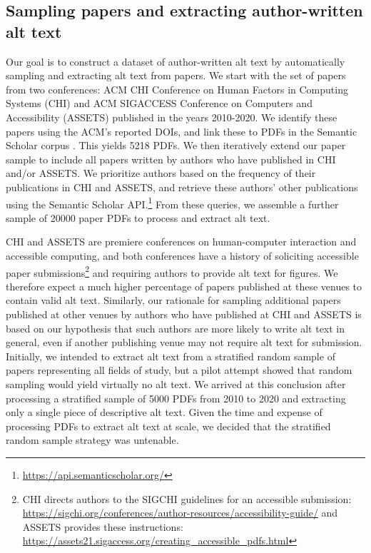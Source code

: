 \documentclass[sigconf]{acmart}
\begin{document}
\subsection{Sampling papers and extracting author-written alt text}

Our goal is to construct a dataset of author-written alt text by automatically sampling and extracting alt text from papers. We start with the set of papers from two conferences: ACM CHI Conference on Human Factors in Computing Systems (CHI) and ACM SIGACCESS Conference on Computers and Accessibility (ASSETS) published in the years 2010-2020. We identify these papers using the ACM's reported DOIs, and link these to PDFs in the Semantic Scholar corpus \citep{Ammar2018ConstructionOT}. This yields 5218 PDFs. We then iteratively extend our paper sample to include all papers written by authors who have published in CHI and/or ASSETS. We prioritize authors based on the frequency of their publications in CHI and ASSETS, and retrieve these authors' other publications using the Semantic Scholar API.\footnote{\href{https://api.semanticscholar.org/}{https://api.semanticscholar.org/}} From these queries, we assemble a further sample of 20000 paper PDFs to process and extract alt text.

CHI and ASSETS are premiere conferences on human-computer interaction and accessible computing, and both conferences have a history of soliciting accessible paper submissions\footnote{CHI directs authors to the SIGCHI guidelines for an accessible submission: \href{https://sigchi.org/conferences/author-resources/accessibility-guide/}{https://sigchi.org/conferences/author-resources/accessibility-guide/} and ASSETS provides these instructions: \href{https://assets21.sigaccess.org/creating_accessible_pdfs.html}{https://assets21.sigaccess.org/creating\_accessible\_pdfs.html}} and requiring authors to provide alt text for figures. We therefore expect a much higher percentage of papers published at these venues to contain valid alt text.
Similarly, our rationale for sampling additional papers published at other venues by authors who have published at CHI and ASSETS is based on our hypothesis that such authors are more likely to write alt text in general, even if another publishing venue may not require alt text for submission. Initially, we intended to extract alt text from a stratified random sample of papers representing all fields of study, but a pilot attempt showed that random sampling would yield virtually no alt text. We arrived at this conclusion after processing a stratified sample of 5000 PDFs from 2010 to 2020 and extracting only a single piece of descriptive alt text. Given the time and expense of processing PDFs to extract alt text at scale, we decided that the stratified random sample strategy was untenable. 
\end{document}
